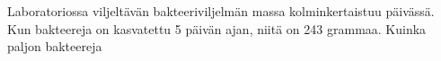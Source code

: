 	\begin{tehtava}
	 Laboratoriossa viljeltävän bakteeriviljelmän massa kolminkertaistuu päivässä. Kun bakteereja on kasvatettu 5 päivän ajan, niitä on 243 grammaa. Kuinka paljon bakteereja
	 \begin{vastaus}
	 \end{vastaus}
	\end{tehtava}
